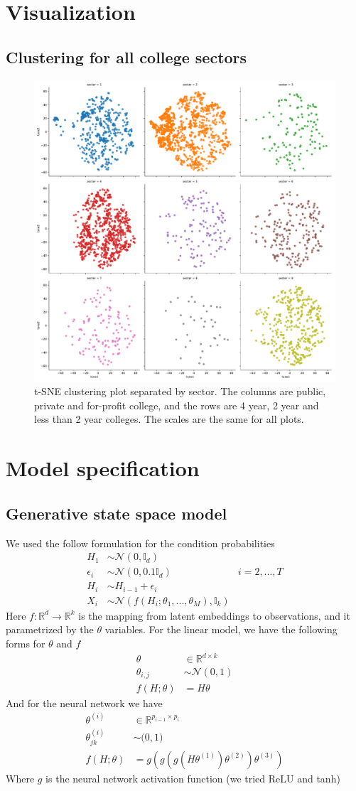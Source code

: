 \documentclass[11pt,letter]{article}
\newcommand{\iden}[1]{\mathbb{I}_{#1}}
\begin{document}
\section{Visualization}
\subsection{Clustering for all college sectors}
\begin{figure}[H]
\centering
\includegraphics[width=0.5\linewidth]{tsne_linear_all.pdf}
\caption{t-SNE clustering plot separated by sector. The columns are public, private and for-profit college, and the rows are 4 year, 2 year and less than 2 year colleges. The scales are the same for all plots. }
\end{figure}
\section{Model specification}
\subsection{Generative state space model}\label{model}
We used the follow formulation for the condition probabilities
\begin{align*}
H_1 & \sim \mathcal{N}(0, \iden d )\\
\epsilon_i &\sim \mathcal{N}(0, 0.1 \iden d ) & i=2,...,T\\
H_i & \sim H_{i-1} + \epsilon_i\\
X_i & \sim \mathcal{N}(f(H_i;\theta_1,...,\theta_M), \iden k )
\end{align*}
Here $f:\mathbb{R}^d\rightarrow\mathbb{R}^k$ is the mapping from latent embeddings to observations, and it parametrized by the $\theta$ variables. For the linear model, we have the following forms for $\theta$ and $f$
\begin{align*}
\theta &\in \mathbb{R}^{d\times k}\\
\theta_{i,j} &\sim \mathcal{N}(0,1)\\
f(H;\theta) &= H\theta 
\end{align*}
And for the neural network we have
\begin{align*}
\theta ^ {(i)} &\in \mathbb{R} ^ {p_{i-1}\times p_i}\\
\theta ^ {(i)}_{jk} &\sim \mathcal(0,1)\\
f(H;\theta) &= g(g(g(H\theta^{(1)})\theta^{(2)})\theta^{(3)})
\end{align*}
Where $g$ is the neural network activation function (we tried ReLU and tanh)



\end{document}
